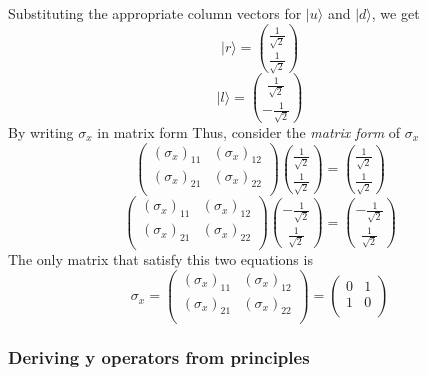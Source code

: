 \documentclass[a4paper,10pt]{article}
\begin{document}
Substituting the appropriate column vectors for $|u\rangle$ and $|d\rangle$, we get
$$|r\rangle = \binom{\frac{1}{\sqrt{2}}}{\frac{1}{\sqrt{2}}}$$
$$|l\rangle = \binom{\frac{1}{\sqrt{2}}}{-\frac{1}{\sqrt{2}}}$$
By writing $\sigma_x$ in matrix form 
Thus, consider the \textit{matrix form} of $\sigma_x$
\begin{equation*}
\left(\begin{matrix}
    (\sigma_x)_{11} & (\sigma_x)_{12} \\
    (\sigma_x)_{21} & (\sigma_x)_{22} \\
\end{matrix}\right) \binom{\frac{1}{\sqrt{2}}}{\frac{1}{\sqrt{2}}} = \binom{\frac{1}{\sqrt{2}}}{\frac{1}{\sqrt{2}}}
\end{equation*}
\begin{equation*}
\left(\begin{matrix}
    (\sigma_x)_{11} & (\sigma_x)_{12} \\
    (\sigma_x)_{21} & (\sigma_x)_{22} \\
\end{matrix}\right) \binom{-\frac{1}{\sqrt{2}}}{\frac{1}{\sqrt{2}}} = \binom{-\frac{1}{\sqrt{2}}}{\frac{1}{\sqrt{2}}}
\end{equation*}
The only matrix that satisfy this two equations is
\begin{equation*}
\sigma_x = \left(\begin{matrix}
    (\sigma_x)_{11} & (\sigma_x)_{12} \\
    (\sigma_x)_{21} & (\sigma_x)_{22} \\
\end{matrix}\right) = \left(\begin{matrix}
    0 & 1 \\
    1 & 0 \\
\end{matrix}\right)
\end{equation*}

\subsubsection{Deriving y operators from principles}
\end{document}
